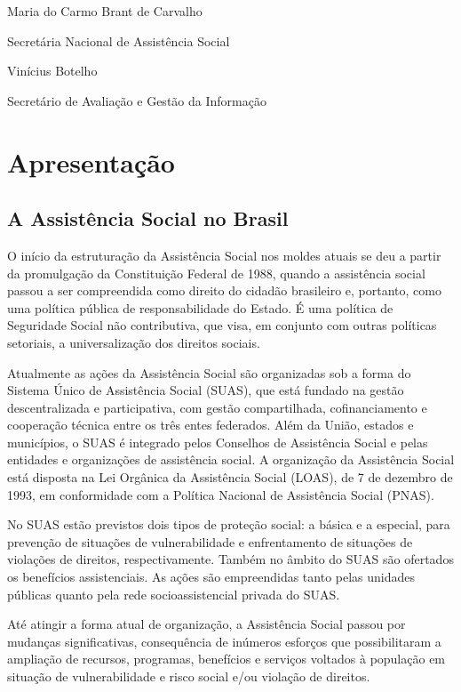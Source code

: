 \documentclass[brazilian]{report}
\begin{document}
Maria do Carmo Brant de Carvalho

Secretária Nacional de Assistência Social

Vinícius Botelho

Secretário de Avaliação e Gestão da Informação

\tableofcontents
 
\chapter*{Apresentação}

\section*{A Assistência Social no Brasil}

O início da estruturação da Assistência Social nos moldes atuais se deu a partir da promulgação da Constituição Federal de 1988, quando a assistência social passou a ser compreendida como direito do cidadão brasileiro e, portanto, como uma política pública de responsabilidade do Estado. É uma política de Seguridade Social não contributiva, que visa, em conjunto com outras políticas setoriais, a universalização dos direitos sociais.

Atualmente as ações da Assistência Social são organizadas sob a forma do Sistema Único de Assistência Social (SUAS), que está fundado na gestão descentralizada e participativa, com gestão compartilhada, cofinanciamento e cooperação técnica entre os três entes federados. Além da União, estados e municípios, o SUAS é integrado pelos Conselhos de Assistência Social e pelas entidades e organizações de assistência social. A organização da Assistência Social está disposta na Lei Orgânica da Assistência Social (LOAS), de 7 de dezembro de 1993, em conformidade com a Política Nacional de Assistência Social (PNAS).

No SUAS estão previstos dois tipos de proteção social: a básica e a especial, para prevenção de situações de vulnerabilidade e enfrentamento de situações de violações de direitos, respectivamente. Também no âmbito do SUAS são ofertados os benefícios assistenciais. As ações são empreendidas tanto pelas unidades públicas quanto pela rede socioassistencial privada do SUAS.

Até atingir a forma atual de organização, a Assistência Social passou por mudanças significativas, consequência de inúmeros esforços que possibilitaram a ampliação de recursos, programas, benefícios e serviços voltados à população em situação de vulnerabilidade e risco social e/ou violação de direitos.
\end{document}

